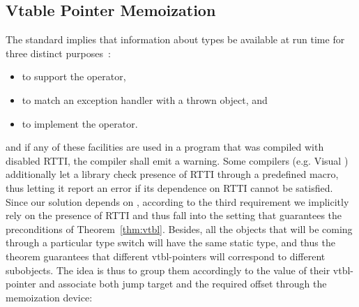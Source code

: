 \subsection{Vtable Pointer Memoization}
\label{sec:vtblmem}


The \Cpp{} standard implies that information about types be available at run time 
for three distinct purposes~\cite[.1]{C++ABI}:

\begin{itemize}
\setlength{\itemsep}{0pt}
\setlength{\parskip}{0pt}
\item to support the  operator,
\item to match an exception handler with a thrown object, and
\item to implement the  operator.
\end{itemize}

\noindent
and if any of these facilities are used in a program that was compiled with 
disabled RTTI, the compiler shall emit a warning. Some 
compilers (e.g. Visual \Cpp{}) additionally let a library check presence of RTTI 
through a predefined macro, thus letting it report an error if its dependence on 
RTTI cannot be satisfied. Since our solution depends on %
, according to the third requirement we implicitly rely on the presence of RTTI and thus 
fall into the setting that guarantees the preconditions of Theorem~\ref{thm:vtbl}.
Besides, all the objects that will be coming through a particular type switch will 
have the same static type, and thus the theorem guarantees that different vtbl-pointers 
will correspond to different subobjects. The idea is thus to group them 
accordingly to the value of their vtbl-pointer and associate both jump target 
and the required offset through the memoization device:


